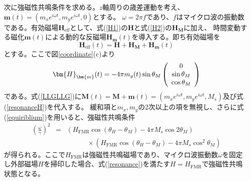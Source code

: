 次に強磁性共鳴条件を求める。$z$軸周りの歳差運動を考え、$\bm{m}(t)=(m_x e^{i\omega t}, m_y e^{i\omega t}, 0)$とする。
$\omega=2\pi f$であり、$f$はマイクロ波の振動数である。有効磁場$\bm{H}_\text{eff}$として、式(\ref{H1})の$\bm{H}$と式(\ref{H2})の$\bm{H}_{\bm{M}}$に加え、
時間変動する磁化$\bm{m} (t)$による動的な反磁場$\bm{H}_{\bm{m}}(t)$を導入する。即ち有効磁場を
\begin{equation}
\bm{H}_\text{eff}(t)=\bm{H}+\bm{H}_{\bm{M}}+\bm{H}_{\bm{m}}(t)\label{resonanceH}
\end{equation}
とする。ここで図\ref{coordinate}(c)より
\begin{equation}
\bm{H}_{\bm{m}}(t)  =  - 4\pi m_y(t) \sin \theta_M\left( {\begin{array}{*{20}c}
   0  \\
   {\sin \theta_M }  \\
   {\cos \theta_M  }  \\
\end{array}} \right)
\end{equation}
である。式(\ref{LLGLLG})に$\bm{M}(t)=\bm{M}+\bm{m}(t)=(m_x e^{i\omega t}, m_y e^{i\omega t}, M_s)$及び式(\ref{resonanceH})を代入する。
緩和項と$m_x, m_y$の2次以上の項を無視し、さらに式(\ref{equiriblium})を用いると、強磁性共鳴条件
\begin{eqnarray}
\left(\frac{\omega}{\gamma}\right)^2&=&\left( H_\text{FMR}\cos(\theta_H-\theta_M)-4\pi M_s\cos 2\theta_M \right) \nonumber \\
&&\hspace{3em} \times \left( H_\text{FMR}\cos(\theta_H-\theta_M)-4\pi M_s \cos^2\theta_M \right) \label{resonance}
\end{eqnarray}
が得られる。ここで$H_\text{FMR}$は強磁性共鳴磁場であり、マイクロ波振動数$\omega$を固定し外部磁場$H$を掃印した場合、式(\ref{resonance})を満たす$H=H_\text{FMR}$で強磁性共鳴状態となる。


